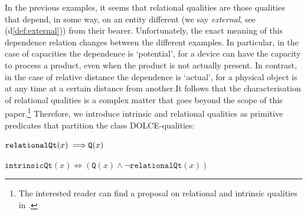 \documentclass[sw]{iosart2x}
\newcommand{\bflist}{\begin{list}{}{\setlength{\topsep}{2mm}\setlength{\partopsep}{0mm}\setlength{\parsep}{0mm}\setlength{\leftmargin}{9mm}\setlength{\labelwidth}{8mm}}}
\newcommand{\eflist}{\end{list}}
\newcommand{\AxLabel}{\textrm{a}}
\newcommand{\DefLabel}{\textrm{d}}
\newcounter{cntax}
\newcommand{\myax}[1]{\refstepcounter{cntax}\begin{small}{\bf \AxLabel\thecntax\label{ax:#1}}\end{small}}
\newcounter{cntdef}
\newcommand{\mydf}[1]{\refstepcounter{cntdef}\begin{small}{\bf \DefLabel\thecntdef\label{def:#1}}\end{small}}
\newcommand{\refdf}[1]{({\DefLabel}\ref{#1})}
\newcommand{\generalStyle}[1]{\texttt{#1}}
\newcommand{\uniRel}[2]{\generalStyle{#1}(#2)}
\newcommand{\myiff}{\Longleftrightarrow}
\newcommand{\myfi}{\hspace{0.9mm} \Longrightarrow}
\newcommand{\DOLCE}{\textsc{DOLCE}\xspace} %
\newcommand{\DOLCEQuality}[1]{\uniRel{Q}{#1}}
\newcommand{\RelationalQuality}[1]{\uniRel{relationalQt}{#1}}
\newcommand{\IntrinsicQuality}[1]{\uniRel{intrinsicQt}{#1}}
\newcommand{\firstTimeKeyWord}[1]{\textit{#1}}
\begin{document}
In the previous examples, it seems that relational qualities are those qualities that depend, in some way, on an entity different (we say \firstTimeKeyWord{external}, see \refdf{def:external}) from their bearer. Unfortunately, the exact meaning of this dependence relation changes between the different examples. In particular, in the case of capacities the dependence is `potential', for a device can have the capacity to process a product, even when the product is not actually present. In contrast, in the case of relative distance the dependence is `actual', for a physical object is at any time at a certain distance from another.It follows that the characterisation of relational qualities is a complex matter that goes beyond the scope of this paper.\footnote{The interested reader can find a proposal on relational and intrinsic qualities in \cite{fonsecaRelationsOntologyDrivenConceptual2019}.} Therefore, we introduce intrinsic and relational qualities as primitive predicates that partition the class \DOLCE-qualities: 
\bflist
  \item[\myax{relationalQtPartialDef}] $ \RelationalQuality{x} \myfi \DOLCEQuality{x} $ 
  \item[\mydf{intrinsicQtPartialDef}] $ \IntrinsicQuality{x} \myiff  ( \DOLCEQuality{x} \land \neg  \RelationalQuality{x})$
  \eflist
\end{document}
